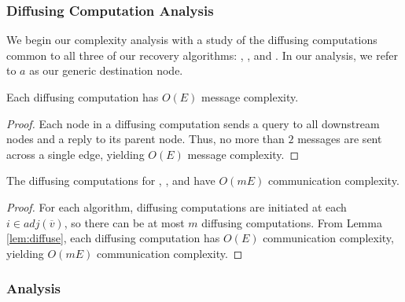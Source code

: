 {\subsubsection{Diffusing Computation Analysis}
\label{subsub:diffuse-complex}

We begin our complexity analysis with a study of the diffusing computations common to all three of our recovery algorithms: \seconds, \cprs, and \purges. 
In our analysis, we refer to $a$ as our generic destination node.  

\begin{lemma}
\label{lem:diffuse}
Each diffusing computation has $O(E)$ message complexity.
\end{lemma}

\begin{proof}
Each node in a diffusing computation sends a query to all downstream nodes and a reply to its parent node. 
Thus, no more than $2$ messages are sent across a single edge, yielding $O(E)$ message complexity.
\end{proof}


\begin{theorem}
\label{lem:diffuse-total}
The diffusing computations for \seconds, \cprs, and \purge have $O(mE)$ communication complexity.
\end{theorem}

\begin{proof}
For each algorithm, diffusing computations are initiated at each $i \in adj(\overline{v})$, so there can be at most $m$ diffusing computations. 
From Lemma \ref{lem:diffuse}, each diffusing computation has $O(E)$ 
communication complexity, yielding $O(mE)$ communication complexity. %
\end{proof}


\subsubsection{\second Analysis}
\label{subsubsec:second-analysis}


}
